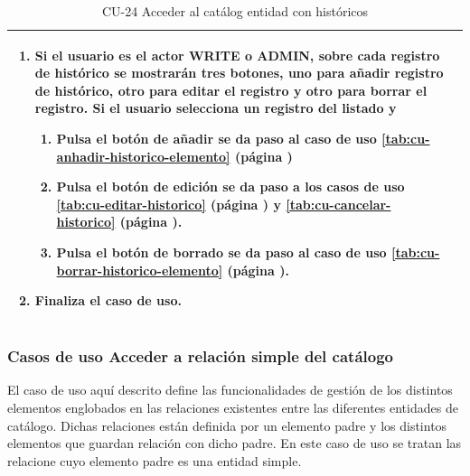 \begin{table} [H]
{\begin{tabular}{| m{3cm} | m{11cm} |}
\begin{enumerate}
		\item Si el usuario es el actor WRITE o ADMIN, sobre cada registro de histórico se mostrarán tres botones, uno para añadir registro de histórico, otro para editar el registro y otro para borrar el registro. Si el usuario selecciona un registro del listado y
		    \begin{enumerate}
		         \item Pulsa el botón de añadir se da paso al caso de uso \ref{tab:cu-anhadir-historico-elemento} (página \pageref{tab:cu-anhadir-historico-elemento})
		        \item Pulsa el botón de edición se da paso a los casos de uso \ref{tab:cu-editar-historico} (página \pageref{tab:cu-editar-historico}) y \ref{tab:cu-cancelar-historico} (página \pageref{tab:cu-cancelar-historico}).
		        \item Pulsa el botón de borrado se da paso al caso de uso \ref{tab:cu-borrar-historico-elemento} (página \pageref{tab:cu-borrar-historico-elemento}).
		    \end{enumerate} 
		\item Finaliza el caso de uso.
	  \end{enumerate} 	  	  
	  \\\hline
    \end{tabular}
    } %
    \caption{CU-24 Acceder al catálog entidad con históricos}
    \label{tab:cu-listar-catálogo-historico}
\end{table}



\subsubsection{Casos de uso Acceder a relación simple del catálogo} 
\label{sub:cu-relacion-catalogo-simple}

El caso de uso aquí descrito define las funcionalidades de gestión de los distintos elementos englobados en las relaciones existentes entre las diferentes entidades de catálogo. Dichas relaciones están definida por un elemento padre y los distintos elementos que guardan relación con dicho padre. En este caso de uso se tratan las relacione cuyo elemento padre es una entidad simple.



